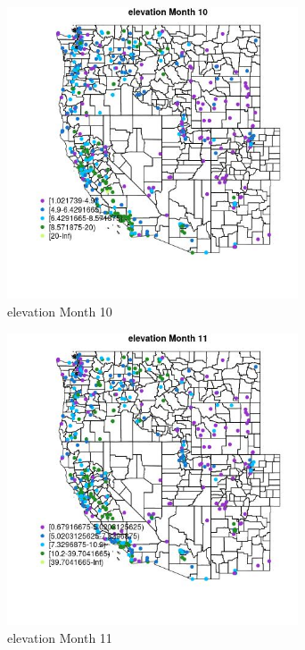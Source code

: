 \begin{figure} 
\centering  
\includegraphics[width=0.77\textwidth]{Code_Outputs/ML_input_report_ML_input_PM25_Step5_part_d_de_duplicated_aves_ML_input_MapObsMo10elevation.jpg} 
\caption{\label{fig:ML_input_report_ML_input_PM25_Step5_part_d_de_duplicated_aves_ML_inputMapObsMo10elevation}elevation Month 10} 
\end{figure} 
 

\begin{figure} 
\centering  
\includegraphics[width=0.77\textwidth]{Code_Outputs/ML_input_report_ML_input_PM25_Step5_part_d_de_duplicated_aves_ML_input_MapObsMo11elevation.jpg} 
\caption{\label{fig:ML_input_report_ML_input_PM25_Step5_part_d_de_duplicated_aves_ML_inputMapObsMo11elevation}elevation Month 11} 
\end{figure} 
 

